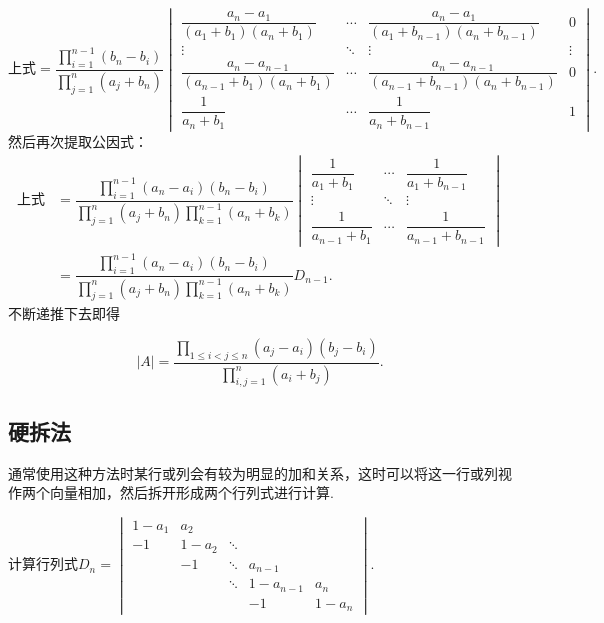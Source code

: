 \begin{solution}
    \[ \text{上式} = \dfrac{\prod\limits_{i=1}^{n-1}(b_n-b_i)}{\prod\limits_{j=1}^{n}(a_j+b_n)}
        \begin{vmatrix}
            \dfrac{a_n-a_1}{(a_1+b_1)(a_n+b_1)}         & \cdots & \dfrac{a_n-a_1}{(a_1+b_{n-1})(a_n+b_{n-1})}         & 0      \\[2ex]
            \vdots                                      & \ddots & \vdots                                              & \vdots \\[2ex]
            \dfrac{a_n-a_{n-1}}{(a_{n-1}+b_1)(a_n+b_1)} & \cdots & \dfrac{a_n-a_{n-1}}{(a_{n-1}+b_{n-1})(a_n+b_{n-1})} & 0      \\[2ex]
            \dfrac{1}{a_n+b_1}                          & \cdots & \dfrac{1}{a_n+b_{n-1}}                              & 1
        \end{vmatrix}. \]
    然后再次提取公因式：
    \begin{align*}
        \text{上式} & = \dfrac{\prod\limits_{i=1}^{n-1}(a_n-a_i)(b_n-b_i)}{\prod\limits_{j=1}^{n}(a_j+b_n)\prod\limits_{k=1}^{n-1}(a_n+b_k)}
        \begin{vmatrix}
            \dfrac{1}{a_1+b_1}     & \cdots & \dfrac{1}{a_1+b_{n-1}}     \\[2ex]
            \vdots                 & \ddots & \vdots                     \\[2ex]
            \dfrac{1}{a_{n-1}+b_1} & \cdots & \dfrac{1}{a_{n-1}+b_{n-1}}
        \end{vmatrix}                                                         \\[2ex]
                    & = \dfrac{\prod\limits_{i=1}^{n-1}(a_n-a_i)(b_n-b_i)}{\prod\limits_{j=1}^{n}(a_j+b_n)\prod\limits_{k=1}^{n-1}(a_n+b_k)} D_{n-1}.
    \end{align*}
    不断递推下去即得

    \[|A| = \dfrac{\prod\limits_{1 \leqslant i < j \leqslant n}(a_j - a_i)(b_j - b_i)}{\prod\limits_{i,j=1}^{n}(a_i + b_j)}.\]
\end{solution}

\subsection{硬拆法}

通常使用这种方法时某行或列会有较为明显的加和关系，这时可以将这一行或列视作两个向量相加，然后拆开形成两个行列式进行计算.

\begin{example}{}{}
    计算行列式$D_n=\begin{vmatrix}
            1-a_{1} & a_{2}   &        &           &         \\
            -1      & 1-a_{2} & \ddots &           &         \\
                    & -1      & \ddots & a_{n-1}   &         \\
                    &         & \ddots & 1-a_{n-1} & a_{n}   \\
                    &         &        & -1        & 1-a_{n}
        \end{vmatrix}$.
\end{example}

